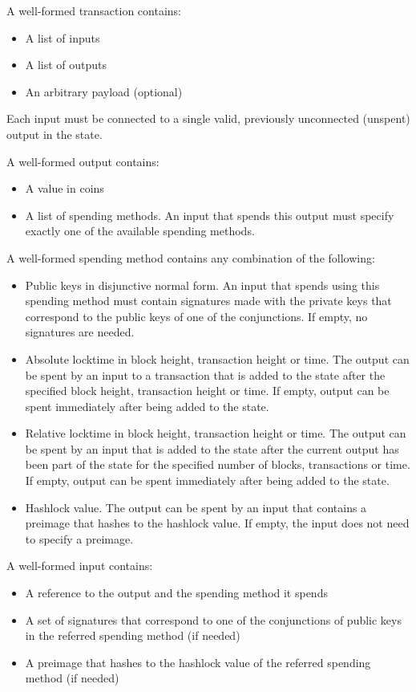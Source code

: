 A well-formed transaction contains:
\begin{itemize}
  \item A list of inputs
  \item A list of outputs
  \item An arbitrary payload (optional)
\end{itemize}
Each input must be connected to a single valid, previously unconnected (unspent)
output in the state.

A well-formed output contains:
\begin{itemize}
  \item A value in coins
  \item A list of spending methods. An input that spends this output must
  specify exactly one of the available spending methods.
\end{itemize}

A well-formed spending method contains any combination of the following:
\begin{itemize}
  \item Public keys in disjunctive normal form. An input that spends using this
  spending method must contain signatures made with the private keys that
  correspond to the public keys of one of the conjunctions. If empty, no
  signatures are needed.
  \item Absolute locktime in block height, transaction height or time. The
  output can be spent by an input to a transaction that is added to the state
  after the specified block height, transaction height or time. If empty, output
  can be spent immediately after being added to the state.
  \item Relative locktime in block height, transaction height or time. The
  output can be spent by an input that is added to the state after the current
  output has been part of the state for the specified number of blocks,
  transactions or time. If empty, output can be spent immediately after being
  added to the state.
  \item Hashlock value. The output can be spent by an input that contains a
  preimage that hashes to the hashlock value. If empty, the input does not need
  to specify a preimage.
\end{itemize}

A well-formed input contains:
\begin{itemize}
  \item A reference to the output and the spending method it spends
  \item A set of signatures that correspond to one of the conjunctions of public
  keys in the referred spending method (if needed)
  \item A preimage that hashes to the hashlock value of the referred spending
  method (if needed)
\end{itemize}

